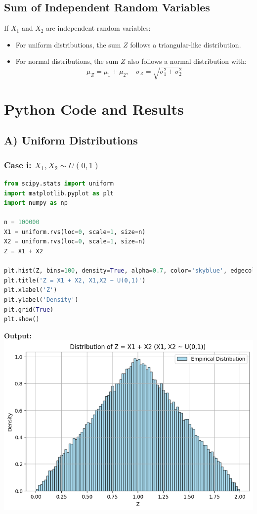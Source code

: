 \documentclass[12pt]{article}
\begin{document}
\subsection*{Sum of Independent Random Variables}
If \( X_1 \) and \( X_2 \) are independent random variables:
\begin{itemize}
  \item For uniform distributions, the sum \( Z \) follows a triangular-like distribution.
  \item For normal distributions, the sum \( Z \) also follows a normal distribution with:
  \[
  \mu_Z = \mu_1 + \mu_2, \quad \sigma_Z = \sqrt{\sigma_1^2 + \sigma_2^2}
  \]
\end{itemize}

\section*{Python Code and Results}

\subsection*{A) Uniform Distributions}

\subsubsection*{Case i: \( X_1, X_2 \sim U(0,1) \)}
\begin{lstlisting}[language=Python]
from scipy.stats import uniform
import matplotlib.pyplot as plt
import numpy as np

n = 100000
X1 = uniform.rvs(loc=0, scale=1, size=n)
X2 = uniform.rvs(loc=0, scale=1, size=n)
Z = X1 + X2

plt.hist(Z, bins=100, density=True, alpha=0.7, color='skyblue', edgecolor='black')
plt.title('Z = X1 + X2, X1,X2 ~ U(0,1)')
plt.xlabel('Z')
plt.ylabel('Density')
plt.grid(True)
plt.show()
\end{lstlisting}

\textbf{Output:} \\
\includegraphics[width=0.8\linewidth]{uniform_0_1.png}
\end{document}

